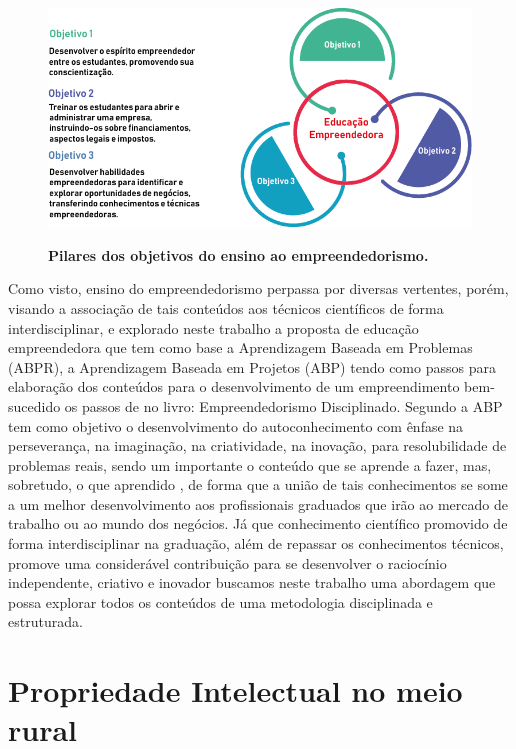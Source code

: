 \begin{figure}[!htb]
\centering
\caption{\textbf{Pilares dos objetivos do ensino ao empreendedorismo.}}
\includegraphics[scale=0.8]{Imagens/figura2.png}
\label{figura_3}
\end{figure}
\newpage

Como visto, ensino do empreendedorismo perpassa por diversas vertentes, porém, visando a associação de tais conteúdos aos técnicos científicos de forma interdisciplinar, e explorado neste trabalho a proposta de educação empreendedora que tem como base a Aprendizagem Baseada em Problemas (ABPR), a Aprendizagem Baseada em Projetos (ABP) \cite{bender_aprendizagem_2015} tendo como passos para elaboração dos conteúdos para o desenvolvimento de um empreendimento bem-sucedido os passos de \cite{aulet_empreendedorismo_2019} no livro: Empreendedorismo Disciplinado. 
Segundo \cite{bender_aprendizagem_2015} a ABP tem como objetivo o desenvolvimento do autoconhecimento com ênfase na perseverança, na imaginação, na criatividade, na inovação, para resolubilidade de problemas reais, sendo um importante o conteúdo que se aprende a fazer, mas, sobretudo, o que aprendido \cite{souza_disseminacao_2001}, de forma que a união de tais conhecimentos se some a um melhor desenvolvimento aos profissionais graduados que irão ao mercado de trabalho ou ao mundo dos negócios. Já que conhecimento científico promovido de forma interdisciplinar na graduação, além de repassar os conhecimentos técnicos, promove  uma considerável contribuição para se desenvolver o raciocínio independente, criativo e inovador buscamos neste trabalho uma abordagem que possa explorar todos os conteúdos de uma metodologia disciplinada e estruturada.


\section{Propriedade Intelectual no meio rural}

